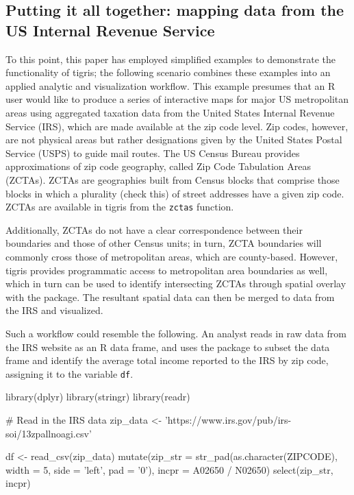 \subsection{Putting it all together: mapping data from the US Internal
Revenue
Service}\label{putting-it-all-together-mapping-data-from-the-us-internal-revenue-service}

To this point, this paper has employed simplified examples to
demonstrate the functionality of tigris; the following scenario combines
these examples into an applied analytic and visualization workflow. This
example presumes that an R user would like to produce a series of
interactive maps for major US metropolitan areas using aggregated
taxation data from the United States Internal Revenue Service (IRS),
which are made available at the zip code level. Zip codes, however, are
not physical areas but rather designations given by the United States
Postal Service (USPS) to guide mail routes. The US Census Bureau
provides approximations of zip code geography, called Zip Code
Tabulation Areas (ZCTAs). ZCTAs are geographies built from Census blocks
that comprise those blocks in which a plurality (check this) of street
addresses have a given zip code. ZCTAs are available in tigris from the
\texttt{zctas} function.

Additionally, ZCTAs do not have a clear correspondence between their
boundaries and those of other Census units; in turn, ZCTA boundaries
will commonly cross those of metropolitan areas, which are county-based.
However, tigris provides programmatic access to metropolitan area
boundaries as well, which in turn can be used to identify intersecting
ZCTAs through spatial overlay with the  package. The
resultant spatial data can then be merged to data from the IRS and
visualized.

Such a workflow could resemble the following. An analyst reads in raw
data from the IRS website as an R data frame, and uses the
 package to subset the data frame and identify the
average total income reported to the IRS by zip code, assigning it to
the variable \texttt{df}.

\begin{Schunk}
\begin{Sinput}
library(dplyr)
library(stringr)
library(readr)

# Read in the IRS data
zip_data <- 'https://www.irs.gov/pub/irs-soi/13zpallnoagi.csv'

df <- read_csv(zip_data) %
  mutate(zip_str = str_pad(as.character(ZIPCODE), width = 5, side = 'left', pad = '0'), 
         incpr = A02650 / N02650) %
  select(zip_str, incpr)
\end{Sinput}
\end{Schunk}

